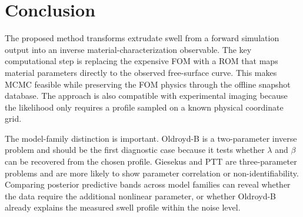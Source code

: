 \documentclass{elsarticle}
\begin{document}


\section{Conclusion}

The proposed method transforms extrudate swell from a forward simulation output
into an inverse material-characterization observable. The key computational
step is replacing the expensive FOM with a ROM that maps material parameters
directly to the observed free-surface curve. This makes MCMC feasible while
preserving the FOM physics through the offline snapshot database. The approach
is also compatible with experimental imaging because the likelihood only
requires a profile sampled on a known physical coordinate grid.

The model-family distinction is important. Oldroyd-B is a two-parameter inverse
problem and should be the first diagnostic case because it tests whether
$\lambda$ and $\beta$ can be recovered from the chosen profile. Giesekus and PTT
are three-parameter problems and are more likely to show parameter correlation
or non-identifiability. Comparing posterior predictive bands across model
families can reveal whether the data require the additional nonlinear
parameter, or whether Oldroyd-B already explains the measured swell profile
within the noise level.
\end{document}
